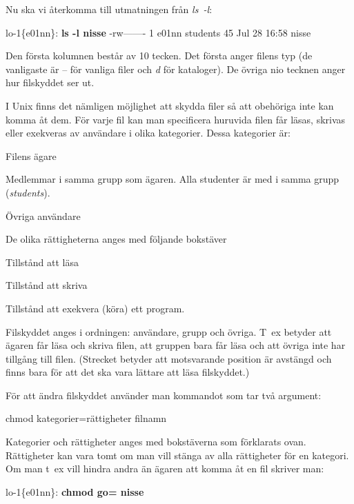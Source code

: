 \documentclass[a4paper,twocolumn]{book}
\begin{document}
\label{sec:filskydd}
Nu ska vi återkomma till utmatningen från \emph{ls~-l}:
\begin{example}
\scriptsize
lo-1\{e01nn\}: \textbf{ls -l nisse}
-rw-------   1 e01nn  students  45  Jul 28 16:58 nisse
\end{example}
Den första kolumnen består av 10 tecken. Det första anger filens typ
(de vanligaste är -- för vanliga filer och \emph{d} för kataloger). De
övriga nio tecknen anger hur filskyddet ser ut.

I Unix finns det nämligen möjlighet att skydda filer så att
obehöriga inte kan komma åt dem. För varje fil kan man specificera
huruvida filen får läsas, skrivas eller exekveras av användare i olika
kategorier. Dessa kategorier är:
\begin{description}
\samepage
\item[u (user)] Filens ägare
\item[g (group)] Medlemmar i samma grupp som ägaren. Alla studenter
  är med i samma grupp (\emph{students}).
\item[o (others)] Övriga användare
\end{description}
De olika rättigheterna anges med följande bokstäver
\begin{description}
\samepage
\item[r (read)] Tillstånd att läsa
\item[w (write)] Tillstånd att skriva 
\item[x (execute)] Tillstånd att exekvera (köra) ett program.
\end{description}

Filskyddet anges i ordningen: användare, grupp och övriga. T~ex
betyder  att ägaren får läsa och skriva filen, att
gruppen bara får läsa och att övriga inte har tillgång till filen.
(Strecket betyder att motsvarande position är avstängd och finns bara
för att det ska vara lättare att läsa filskyddet.)

För att ändra filskyddet använder man kommandot  som
tar två argument:
\begin{ttquote}
  chmod kategorier=rättigheter filnamn
\end{ttquote}
Kategorier och rättigheter anges med bokstäverna som förklarats
ovan. Rättigheter kan vara tomt om man vill stänga av alla rättigheter
för en kategori. Om man t~ex vill hindra andra än ägaren att komma åt
en fil skriver man:
\begin{example}
lo-1\{e01nn\}: \textbf{chmod go= nisse}
\end{example}
\end{document}
